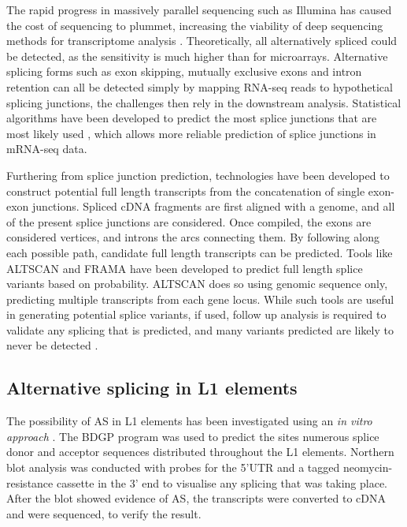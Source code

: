 \documentclass[12pt]{article}
\begin{document}
			The rapid progress in massively parallel sequencing such as Illumina has caused the cost of sequencing to plummet, increasing the viability of deep sequencing methods for transcriptome analysis \citep{Blencowe09}.
			Theoretically, all alternatively spliced could be detected, as the sensitivity is much higher than for microarrays. %
			Alternative splicing forms such as exon skipping, mutually exclusive exons and intron retention can all be detected simply by mapping RNA-seq reads to hypothetical splicing junctions, the challenges then rely in the downstream analysis.
			Statistical algorithms have been developed to predict the most splice junctions that are most likely used \citep{Wang10}, which allows more reliable prediction of splice junctions in mRNA-seq data.
			
			Furthering from splice junction prediction, technologies have been developed to construct potential full length transcripts from the concatenation of single exon-exon junctions.
			Spliced cDNA fragments are first aligned with a genome, and all of the present splice junctions are considered.
			Once compiled, the exons are considered vertices, and introns the arcs connecting them. %
			By following along each possible path, candidate full length transcripts can be predicted.
			Tools like ALTSCAN \citep{Hu15} and FRAMA \citep{Bens16} have been developed to predict full length splice variants based on probability.
			ALTSCAN does so using genomic sequence only, predicting multiple transcripts from each gene locus. 
			While such tools are useful in generating potential splice variants, if used, follow up analysis is required to validate any splicing that is predicted, and many variants predicted are likely to never be detected \citep{Florea06, Hu15}. 
				
		\subsection{Alternative splicing in L1 elements}
	
			The possibility of AS in L1 elements has been investigated using an \textit{in vitro approach} \citep{Belancio06}.
			The BDGP program \citep{Reese97} was used to predict the sites numerous splice donor and acceptor sequences distributed throughout the L1 elements. 
			Northern blot analysis was conducted with probes for the 5'UTR and a tagged neomycin-resistance cassette in the 3' end to visualise any splicing that was taking place.
			After the blot showed evidence of AS, the transcripts were converted to cDNA and were sequenced, to verify the result. 
\end{document}
